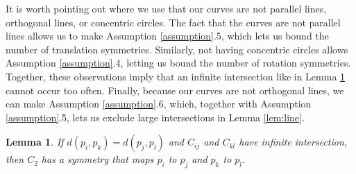\documentclass[12pt]{article}
\newtheorem{lemma}[theorem]{Lemma}
\begin{document}
It is worth pointing out where we use that our curves are not parallel lines, orthogonal lines, or concentric circles.
The fact that the curves are not parallel lines allows us to make Assumption \ref{assumption}.5, 
which lets us bound the number of translation symmetries.
Similarly, not having concentric circles allows Assumption \ref{assumption}.4, letting us bound the number of rotation symmetries.
Together, these observations imply that an infinite intersection like in Lemma \ref{lem:samedist} cannot occur too often.
Finally, because our curves are not orthogonal lines, we can make Assumption \ref{assumption}.6, 
which, together with Assumption \ref{assumption}.5, lets us exclude large intersections in Lemma \ref{lem:line}.

  

\begin{lemma}\label{lem:samedist}
 If $d(p_i, p_k) = d(p_j, p_l)$ and $C_{ij}$ and $C_{kl}$ have infinite intersection,
 then $C_2$ has a symmetry that maps $p_i$ to $p_j$ and $p_k$ to $p_l$.
\end{lemma}
\end{document}
